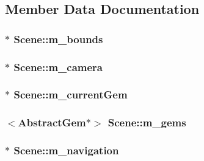 \subsection{Member Data Documentation}
\hypertarget{class_scene_a62831eb6a67ce74ee608b4327bf069f3}{
\subsubsection[{m\+\_\+bounds}]{$\ast$ Scene\+::m\+\_\+bounds\hspace{0.3cm}{\ttfamily [protected]}}}\label{class_scene_a62831eb6a67ce74ee608b4327bf069f3}
\hypertarget{class_scene_ab37f5e133a5fe0803c3df42a4fcba7bf}{
\subsubsection[{m\+\_\+camera}]{$\ast$ Scene\+::m\+\_\+camera\hspace{0.3cm}{\ttfamily [protected]}}}\label{class_scene_ab37f5e133a5fe0803c3df42a4fcba7bf}
\hypertarget{class_scene_aff9d5a2212ba1b5813dc10177f0344cb}{
\subsubsection[{m\+\_\+current\+Gem}]{$\ast$ Scene\+::m\+\_\+current\+Gem\hspace{0.3cm}{\ttfamily [protected]}}}\label{class_scene_aff9d5a2212ba1b5813dc10177f0344cb}
\hypertarget{class_scene_a47d7b35730d7959a640339ed11d18866}{
\subsubsection[{m\+\_\+gems}]{$<${\bf Abstract\+Gem}$\ast$$>$ Scene\+::m\+\_\+gems\hspace{0.3cm}{\ttfamily [protected]}}}\label{class_scene_a47d7b35730d7959a640339ed11d18866}
\hypertarget{class_scene_a595ab554271bd87c4c73f0cce175ff81}{
\subsubsection[{m\+\_\+navigation}]{$\ast$ Scene\+::m\+\_\+navigation\hspace{0.3cm}{\ttfamily [protected]}}}\label{class_scene_a595ab554271bd87c4c73f0cce175ff81}
